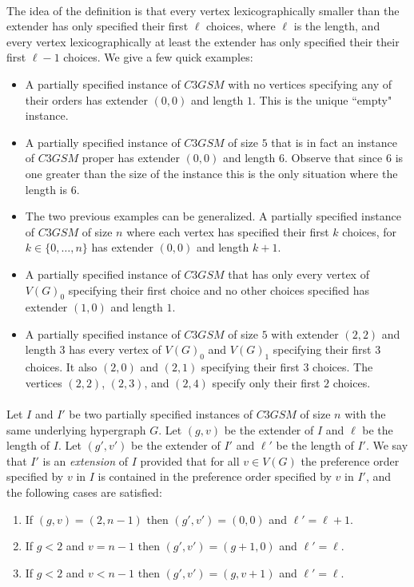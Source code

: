 \paragraph{}
The idea of the definition is that every vertex lexicographically smaller than the extender has only specified their first $\ell$ choices, where $\ell$ is the length, and every vertex lexicographically at least the extender has only specified their their first $\ell-1$ choices. We give a few quick examples:
\begin{itemize}
\item A partially specified instance of $C3GSM$ with no vertices specifying any of their orders has extender $(0,0)$ and length $1$. This is the unique ``empty" instance.
\item A partially specified instance of $C3GSM$ of size $5$ that is in fact an instance of $C3GSM$ proper has extender $(0,0)$ and length $6$. Observe that since $6$ is one greater than the size of the instance this is the only situation where the length is $6$.
\item The two previous examples can be generalized. A partially specified instance of $C3GSM$ of size $n$ where each vertex has specified their first $k$ choices, for $k \in \{0, \dots, n\}$ has extender $(0,0)$ and length $k+1$.
\item A partially specified instance of $C3GSM$ that has only every vertex of $V(G)_0$ specifying their first choice and no other choices specified has extender $(1,0)$ and length $1$.
\item A partially specified instance of $C3GSM$ of size $5$ with extender $(2,2)$ and length $3$ has every vertex of $V(G)_0$ and $V(G)_1$ specifying their first $3$ choices. It also $(2,0)$ and $(2,1)$ specifying their first $3$ choices. The vertices $(2,2)$, $(2,3)$, and $(2,4)$ specify only their first $2$ choices.
\end{itemize}

\paragraph{}Let $I$ and $I'$ be two partially specified instances of $C3GSM$ of size $n$ with the same underlying hypergraph $G$. Let $(g,v)$ be the extender of $I$ and $\ell$ be the length of $I$. Let $(g',v')$ be the extender of $I'$ and $\ell'$ be the length of $I'$. We say that $I'$ is an {\it extension} of $I$ provided that for all $v \in V(G)$ the preference order specified by $v$ in $I$ is contained in the preference order specified by $v$ in $I'$, and the following cases are satisfied:
\begin{enumerate}
\item If $(g,v) = (2,n-1)$ then $(g',v') = (0,0)$ and $\ell' = \ell + 1$.
\item If $g < 2$ and $v = n-1$ then $(g',v') = (g+1, 0)$ and $\ell' = \ell$.
\item If $g<2$ and $v<n-1$ then $(g',v') = (g, v+1)$ and $\ell' = \ell$.
\end{enumerate}


